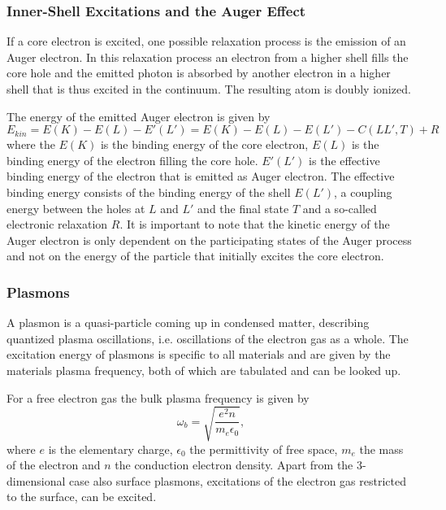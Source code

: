 \documentclass[a4paper,10pt]{scrartcl}
\begin{document}
\subsubsection{Inner-Shell Excitations and the Auger Effect}

If a core electron is excited, one possible relaxation process is the emission of an Auger electron. In this relaxation process an electron from a higher shell fills the core hole and the emitted photon is absorbed by another electron in a higher shell that is thus excited in the continuum. The resulting atom is doubly ionized. 

The energy of the emitted Auger electron is given by
\begin{equation}
E_{kin} = E(K)-E(L)-E'(L') = E(K)-E(L)-E(L')-C(LL',T)+R
\end{equation}
where the $E(K)$ is the binding energy of the core electron, $E(L)$ is the binding energy of the electron filling the core hole. $E'(L')$ is the effective binding energy of the electron that is emitted as Auger electron. The effective binding energy consists of the binding energy of the shell $E(L')$, a coupling energy between the holes at $L$ and $L'$ and the final state $T$ and a so-called electronic relaxation $R$. It is important to note that the kinetic energy of the Auger electron is only dependent on the participating states of the Auger process and not on the energy of the particle that initially excites the core electron.

\subsubsection{Plasmons}

A plasmon is a quasi-particle coming up in condensed matter, describing quantized plasma oscillations, i.e. oscillations of the electron gas as a whole. The excitation energy of plasmons is specific to all materials and are given by the materials plasma frequency, both of which are tabulated and can be looked up. 

For a free electron gas the bulk plasma frequency is given by
\begin{equation}
\omega_{b} = \sqrt{\frac{e^2 n}{m_e \epsilon_0}},
\end{equation}
where $e$ is the elementary charge, $\epsilon_0$ the permittivity of free space, $m_e$ the mass of the electron and $n$ the conduction electron density. Apart from the 3-dimensional case also surface plasmons, excitations of the electron gas restricted to the surface, can be excited.
\end{document}
